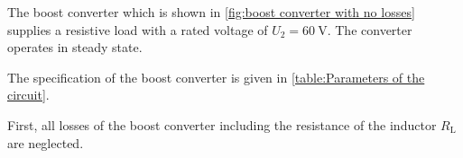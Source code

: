 

The boost converter which is shown in \autoref{fig:boost converter with no losses} supplies a resistive load with a rated voltage of $U_{\mathrm{2}} = \SI{60}{\volt}$. The converter operates in steady state.



The specification of the boost converter is given in \autoref{table:Parameters of the circuit}.



First, all losses of the boost converter including the resistance of the inductor $R_\mathrm{L}$ are neglected.


